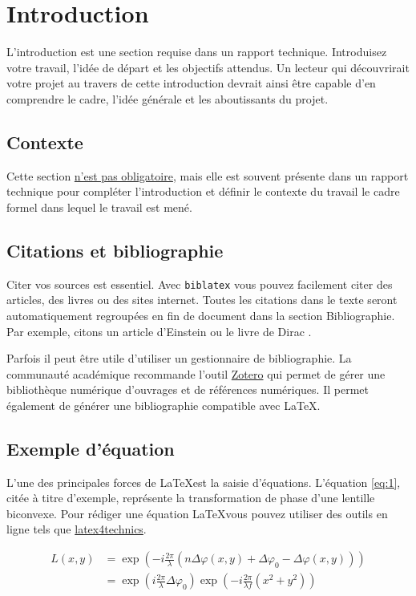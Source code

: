 \documentclass[
    iai, %
    eai, %
]{heig-tb}
\begin{document}
\chapter{Introduction}
L'introduction est une section requise dans un rapport technique. Introduisez votre travail, l'idée de départ et les objectifs attendus. Un lecteur qui découvrirait votre projet au travers de cette introduction devrait ainsi être capable d'en comprendre le cadre, l'idée générale et les aboutissants du projet.

\section{Contexte}
Cette section \underline{n'est pas obligatoire}, mais elle est souvent présente dans un rapport technique pour compléter l'introduction et définir le contexte du travail \cad le cadre formel dans lequel le travail est mené.

\section{Citations et bibliographie}
Citer vos sources est essentiel. Avec \texttt{biblatex} vous pouvez facilement citer des articles, des livres ou des sites internet. Toutes les citations dans le texte seront automatiquement regroupées en fin de document dans la section \guillemotleft Bibliographie\guillemotright. Par exemple, citons un article d'Einstein \cite{einstein} ou le livre de Dirac \cite{dirac}.

Parfois il peut être utile d'utiliser un gestionnaire de bibliographie. La communauté académique recommande l'outil \href{https://www.zotero.org/}{Zotero} qui permet de gérer une bibliothèque numérique d'ouvrages et de références numériques. Il permet également de générer une bibliographie compatible avec \LaTeX.

\section{Exemple d'équation}
L'une des principales forces de \LaTeX est la saisie d'équations. L'équation \ref{eq:1}, citée à titre d'exemple, représente la transformation de phase d'une lentille biconvexe. Pour rédiger une équation \LaTeX vous pouvez utiliser des outils en ligne tels que \href{https://www.latex4technics.com/}{latex4technics}.

\begin{equation} \label{eq:1}
  \begin{split}
    L(x,y) &= \exp\left( - i\frac{{2\pi }}{\lambda }\left( {n\Delta \varphi (x,y) + \Delta {\varphi _0} - \Delta \varphi (x,y)} \right)\right)\\
    &= {\exp\left({i\frac{{2\pi }}{\lambda }\Delta {\varphi _0}}\right)}{\exp\left({ - i\frac{{2\pi }}{{\lambda f}}({x^2} + {y^2})}\right)}
  \end{split}
\end{equation}
\end{document}
